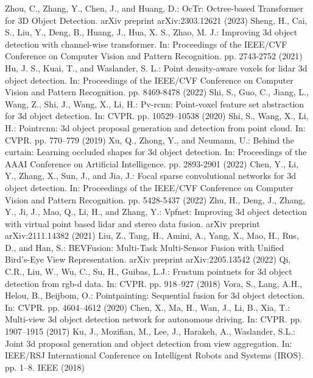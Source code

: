 \begin{sloppypar}
%
%
\begin{thebibliography}{33}
	Zhou, C., Zhang, Y., Chen, J., and Huang, D.: OcTr: Octree-based Transformer for 3D Object Detection. arXiv preprint arXiv:2303.12621 (2023)
	Sheng, H., Cai, S., Liu, Y., Deng, B., Huang, J., Hua, X. S., Zhao, M. J.: Improving 3d object detection with channel-wise transformer. In: Proceedings of the IEEE/CVF Conference on Computer Vision and Pattern Recognition. pp. 2743-2752 (2021)
	Hu, J. S., Kuai, T., and Waslander, S. L.: Point density-aware voxels for lidar 3d object detection. In: Proceedings of the IEEE/CVF Conference on Computer Vision and Pattern Recognition. pp. 8469-8478 (2022)
	Shi, S., Guo, C., Jiang, L., Wang, Z., Shi, J., Wang, X., Li, H.: Pv-rcnn: Point-voxel feature set abstraction for 3d object detection. In: CVPR. pp. 10529–10538 (2020)
	Shi, S., Wang, X., Li, H.: Pointrcnn: 3d object proposal generation and detection from point cloud. In: CVPR. pp. 770–779 (2019)	
	Xu, Q., Zhong, Y., and Neumann, U.: Behind the curtain: Learning occluded shapes for 3d object detection. In: Proceedings of the AAAI Conference on Artificial Intelligence. pp. 2893-2901 (2022)
	Chen, Y., Li, Y., Zhang, X., Sun, J., and Jia, J.: Focal sparse convolutional networks for 3d object detection. In: Proceedings of the IEEE/CVF Conference on Computer Vision and Pattern Recognition. pp. 5428-5437 (2022)
	Zhu, H., Deng, J., Zhang, Y., Ji, J., Mao, Q., Li, H., and Zhang, Y.: Vpfnet: Improving 3d object detection with virtual point based lidar and stereo data fusion. arXiv preprint arXiv:2111.14382 (2021)
	Liu, Z., Tang, H., Amini, A., Yang, X., Mao, H., Rus, D., and Han, S.: BEVFusion: Multi-Task Multi-Sensor Fusion with Unified Bird's-Eye View Representation. arXiv preprint arXiv:2205.13542 (2022)
        Qi, C.R., Liu, W., Wu, C., Su, H., Guibas, L.J.: Frustum 
    pointnets for 3d object detection from rgb-d data. In: CVPR. pp. 918–927 (2018)
        Vora, S., Lang, A.H., Helou, B., Beijbom, O.: Pointpainting: 
    Sequential fusion for 3d object detection. In: CVPR. pp. 4604–4612 (2020)
        Chen, X., Ma, H., Wan, J., Li, B., Xia, T.: Multi-view 3d 
    object detection network for autonomous driving. In: CVPR. pp. 1907–1915 (2017)
        Ku, J., Mozifian, M., Lee, J., Harakeh, A., Waslander, S.L.: 
    Joint 3d proposal generation and object detection from view aggregation. In: IEEE/RSJ International Conference on Intelligent Robots and Systems (IROS). pp. 1–8. IEEE (2018)

\end{thebibliography}
\end{sloppypar}
